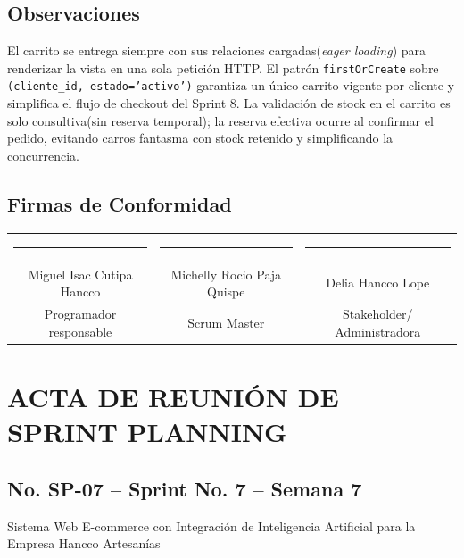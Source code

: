 \documentclass[12pt,a4paper]{article}
\renewcommand{\arraystretch}{1.25}
\begin{document}
\subsection*{Observaciones}

El carrito se entrega siempre con sus relaciones cargadas(\textit{eager loading}) para renderizar la vista en una sola petición HTTP. El patrón \texttt{firstOrCreate} sobre \texttt{(cliente\_id, estado='activo')} garantiza un único carrito vigente por cliente y simplifica el flujo de checkout del Sprint 8. La validación de stock en el carrito es solo consultiva(sin reserva temporal); la reserva efectiva ocurre al confirmar el pedido, evitando carros fantasma con stock retenido y simplificando la concurrencia.

\subsection*{Firmas de Conformidad}

\begin{center}
\renewcommand{\arraystretch}{2}
\begin{tabular}{ccc}
\rule{4.5cm}{0.4pt} & \rule{4.5cm}{0.4pt} & \rule{4.5cm}{0.4pt} \\
Miguel Isac Cutipa Hancco & Michelly Rocio Paja Quispe & Delia Hancco Lope \\
Programador responsable & Scrum Master & Stakeholder/ Administradora
\end{tabular}
\end{center}

\clearpage

\section*{ACTA DE REUNIÓN DE SPRINT PLANNING}

\subsection*{No. SP-07 -- Sprint No. 7 -- Semana 7}

\begin{center}
Sistema Web E-commerce con Integración de Inteligencia Artificial para la Empresa Hancco Artesanías
\end{center}
\end{document}
